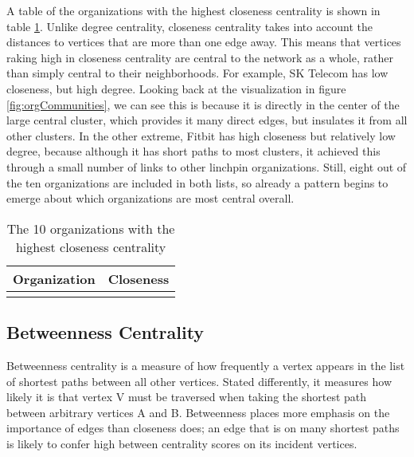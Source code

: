 A table of the organizations with the highest closeness centrality is shown in table \ref{tab:closeness}. Unlike degree centrality, closeness centrality takes into account the distances to vertices that are more than one edge away. This means that vertices raking high in closeness centrality are central to the network as a whole, rather than simply central to their neighborhoods. For example, SK Telecom has low closeness, but high degree. Looking back at the visualization in figure \ref{fig:orgCommunities}, we can see this is because it is directly in the center of the large central cluster, which provides it many direct edges, but insulates it from all other clusters. In the other extreme, Fitbit has high closeness but relatively low degree, because although it has short paths to most clusters, it achieved this through a small number of links to other linchpin organizations. Still, eight out of the ten organizations are included in both lists, so already a pattern begins to emerge about which organizations are most central overall.

\begin{table}
	\begin{tabular}{l|c}%
		\bfseries Organization & \bfseries Closeness%
		\csvreader[head to column names]{closeness.csv}{}%
		{\\\hline\organizationb & \scoreb}%
	\end{tabular}
	\centering
	\caption{The 10 organizations with the highest closeness centrality}\label{tab:closeness}
\end{table}

\subsection{Betweenness Centrality}
Betweenness centrality is a measure of how frequently a vertex appears in the list of shortest paths between all other vertices. Stated differently, it measures how likely it is that vertex V must be traversed when taking the shortest path between arbitrary vertices A and B. Betweenness places more emphasis on the importance of edges than closeness does; an edge that is on many shortest paths is likely to confer high between centrality scores on its incident vertices.

